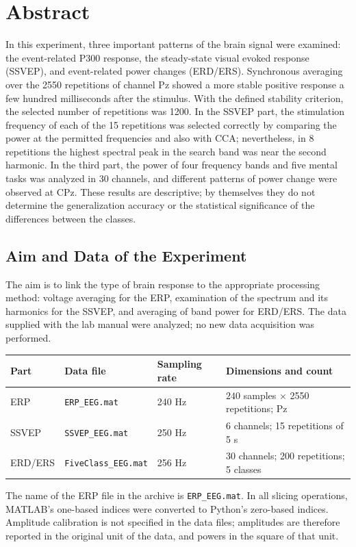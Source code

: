 \section*{Abstract}

In this experiment, three important patterns of the brain signal were examined: the event-related P300 response, the steady-state visual evoked response (SSVEP), and event-related power changes (ERD/ERS). Synchronous averaging over the 2550 repetitions of channel Pz showed a more stable positive response a few hundred milliseconds after the stimulus. With the defined stability criterion, the selected number of repetitions was 1200. In the SSVEP part, the stimulation frequency of each of the 15 repetitions was selected correctly by comparing the power at the permitted frequencies and also with CCA; nevertheless, in 8 repetitions the highest spectral peak in the search band was near the second harmonic. In the third part, the power of four frequency bands and five mental tasks was analyzed in 30 channels, and different patterns of power change were observed at CPz. These results are descriptive; by themselves they do not determine the generalization accuracy or the statistical significance of the differences between the classes.

\subsection*{Aim and Data of the Experiment}

The aim is to link the type of brain response to the appropriate processing method: voltage averaging for the ERP, examination of the spectrum and its harmonics for the SSVEP, and averaging of band power for ERD/ERS. The data supplied with the lab manual were analyzed; no new data acquisition was performed.

\begin{center}
\begin{tabular}{@{}lllp{5.4cm}@{}}
\toprule
\textbf{Part} & \textbf{Data file} & \textbf{Sampling rate} & \textbf{Dimensions and count}\\
\midrule
ERP     & \texttt{ERP\_EEG.mat}      & 240 Hz & $240$ samples $\times$ 2550 repetitions; Pz\\
SSVEP   & \texttt{SSVEP\_EEG.mat}    & 250 Hz & 6 channels; 15 repetitions of 5 s\\
ERD/ERS & \texttt{FiveClass\_EEG.mat} & 256 Hz & 30 channels; 200 repetitions; 5 classes\\
\bottomrule
\end{tabular}
\end{center}

The name of the ERP file in the archive is \texttt{ERP\_EEG.mat}. In all slicing operations, MATLAB's one-based indices were converted to Python's zero-based indices. Amplitude calibration is not specified in the data files; amplitudes are therefore reported in the original unit of the data, and powers in the square of that unit.
